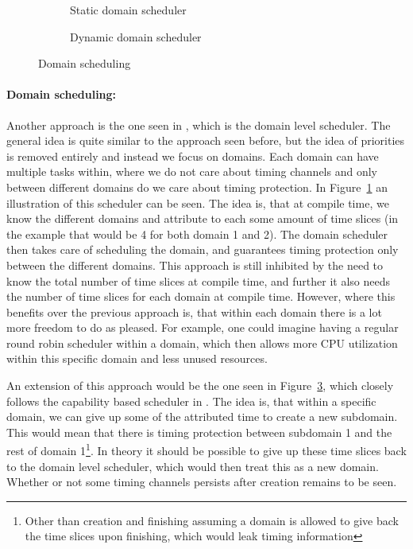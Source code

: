\begin{figure}
  \begin{center}
    \begin{subfigure}[b]{0.45\textwidth}
      
      \caption{Static domain scheduler}
    \label{fig:static_domain_sched}
    \end{subfigure}
    \begin{subfigure}[b]{0.45\textwidth}
      
    \caption{Dynamic domain scheduler}
    \label{fig:dynamic_domain_sched}
    \end{subfigure}
  \end{center}
  \caption{Domain scheduling}
\end{figure}

\paragraph{Domain scheduling:}
Another approach is the one seen in \cite{ge2019}, which is the domain level
scheduler. The general idea is quite similar to the approach seen before, but
the idea of priorities is removed entirely and instead we focus on
domains. Each domain can have multiple tasks within, where we do not care about
timing channels and only between different domains do we care about timing
protection. In Figure~\ref{fig:static_domain_sched} an illustration of this
scheduler can be seen. The idea is, that at compile time, we know the different
domains and attribute to each some amount of time slices (in the example that
would be 4 for both domain 1 and 2). The domain scheduler then takes care of
scheduling the domain, and guarantees timing protection only between the
different domains. This approach is still inhibited by the need to know the
total number of time slices at compile time, and further it also needs the
number of time slices for each domain at compile time. However, where this
benefits over the previous approach is, that within each domain there is a lot
more freedom to do as pleased. For example, one could imagine having a regular
round robin scheduler within a domain, which then allows more CPU utilization
within this specific domain and less unused resources.  

An extension of this approach would be the one seen in
Figure~\ref{fig:dynamic_domain_sched}, which closely follows the capability
based scheduler in \cite{karlsson2025}. The idea is, that within a specific
domain, we can give up some of the attributed time to create a new subdomain.
This would mean that there is timing protection between subdomain 1 and the
rest of domain 1\footnote{Other than creation and finishing assuming a domain
  is allowed to give back the time slices upon finishing, which would leak
timing information}. In theory it should be possible to give up these time
slices back to the domain level scheduler, which would then treat this as a new
domain. Whether or not some timing channels persists after creation remains to
be seen.

